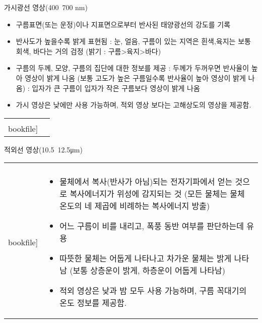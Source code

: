 \begin{frame}[t]{가시광선 영상(400~700 nm)}
	\begin{itemize}\scriptsize
		\item 구름표면(또는 운정)이나 지표면으로부터 반사된 태양광선의 강도를 기록
		\item 반사도가 높을수록 밝게 표현됨 : 눈, 얼음, 구름이 있는 지역은 흰색,육지는 보통 회색, 바다는 거의 검정 (밝기 : 구름>육지>바다)
		\item 구름의 두께, 모양, 구름의 집단에 대한 정보를 제공 : 두께가 두꺼우면 반사율이 높아 영상이 밝게 나옴  (보통 고도가 높은 구름일수록 반사율이 높아 영상이 밝게 나옴)
			: 입자가 큰 구름이 입자가 작은 구름보다 영상이 밝게 나옴
		\item 가시 영상은 낮에만 사용 가능하며, 적외 영상 보다는 고해상도의 영상을 제공함. 
	\end{itemize}
	\begin{tabular}{ll}
		\begin{minipage}[t]{0.94\textwidth}\scriptsize
			\begin{figure}[t]
				\texttt{[image: \\bookfile]}
			\end{figure}
		\end{minipage}	
		&
		\begin{minipage}[t]{0.01\textwidth} \scriptsize	


		\end{minipage}
	\end{tabular}
\end{frame}



\begin{frame}[t]{적외선 영상(10.5~12.5μm)}
	\begin{tabular}{ll}
		\begin{minipage}[t]{0.4\textwidth}\scriptsize
			\begin{figure}[t]
				\texttt{[image: \\bookfile]}
			\end{figure}
		\end{minipage}	
		&
		\begin{minipage}[t]{0.55\textwidth} \scriptsize	
			\begin{itemize}
				\item 물체에서 복사(반사가 아님)되는 전자기파에서 얻는 것으로 복사에너지가 위성에 감지되는 것 (모든 물체는 물체 온도의 네 제곱에 비례하는 복사에너지 방출)
				\item 어느 구름이 비를 내리고, 폭풍 동반 여부를 판단하는데 유용
				\item 따뜻한 물체는 어둡게 나타나고 차가운 물체는 밝게 나타남 (보통 상층운이 밝게, 하층운이 어둡게 나타남)
    			\item 적외 영상은 낮과 밤 모두 사용 가능하며, 구름 꼭대기의 온도 정보를 제공함. 
			 	
			\end{itemize}

		\end{minipage}
	\end{tabular}
\end{frame}



